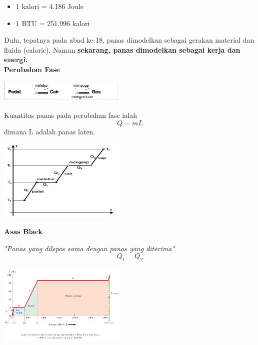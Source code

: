 \documentclass[twocolumn, 11pt]{article}%
\begin{document}
        \begin{itemize}
                \item 1 kalori = 4.186 Joule
                \item 1 BTU = 251.996 kalori
        \end{itemize}

        Dulu, tepatnya pada abad ke-18, panas dimodelkan sebagai gerakan material dan fluida (caloric). Namun \textbf{sekarang, panas dimodelkan sebagai kerja dan energi.}\\
        
        \textbf{Perubahan Fase}

        \begin{center}
            \includegraphics[width=230px]{5.png}
        \end{center}

        Kuantitas panas pada perubahan fase ialah
        \[ Q=mL \]
        dimana L adalah panas laten.
        \begin{center}
            \includegraphics[width=230px]{6.png}
        \end{center}

        \textbf{Asas Black}

        \textit{"Panas yang dilepas sama dengan panas yang diterima"}
        \[Q_1 = Q_2 \]

        \begin{center}
            \includegraphics[width=230px]{7.png}
        \end{center}
\end{document}
